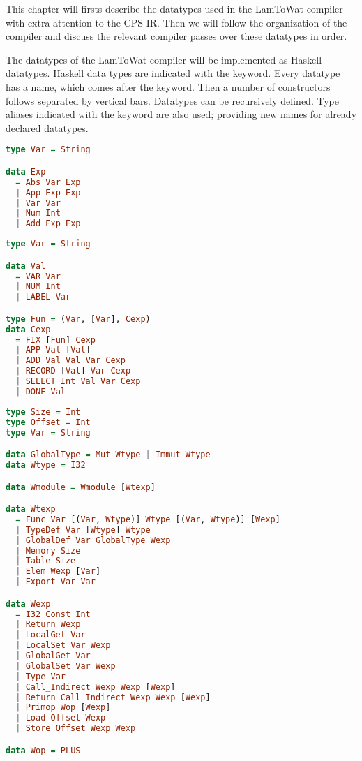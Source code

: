 This chapter will firsts describe the datatypes used in the LamToWat compiler with extra attention to the \ac{CPS} \ac{IR}. Then we will follow the organization of the compiler and discuss the relevant compiler passes over these datatypes in order.

The datatypes of the LamToWat compiler will be implemented as Haskell datatypes. Haskell data types are indicated with the  keyword. Every datatype has a name, which comes after the keyword. Then a number of constructors follows separated by vertical bars. Datatypes can be recursively defined. Type aliases indicated with the  keyword are also used; providing new names for already declared datatypes.


\begin{lstlisting}[language=Haskell]
type Var = String

data Exp
  = Abs Var Exp
  | App Exp Exp
  | Var Var
  | Num Int
  | Add Exp Exp
\end{lstlisting}

\begin{lstlisting}[language=Haskell]
type Var = String

data Val
  = VAR Var
  | NUM Int
  | LABEL Var

type Fun = (Var, [Var], Cexp)
data Cexp
  = FIX [Fun] Cexp
  | APP Val [Val]
  | ADD Val Val Var Cexp
  | RECORD [Val] Var Cexp
  | SELECT Int Val Var Cexp
  | DONE Val
\end{lstlisting}

\begin{lstlisting}[language=Haskell]
type Size = Int
type Offset = Int
type Var = String

data GlobalType = Mut Wtype | Immut Wtype
data Wtype = I32

data Wmodule = Wmodule [Wtexp]

data Wtexp
  = Func Var [(Var, Wtype)] Wtype [(Var, Wtype)] [Wexp]
  | TypeDef Var [Wtype] Wtype
  | GlobalDef Var GlobalType Wexp
  | Memory Size
  | Table Size
  | Elem Wexp [Var]
  | Export Var Var

data Wexp
  = I32_Const Int
  | Return Wexp
  | LocalGet Var
  | LocalSet Var Wexp
  | GlobalGet Var
  | GlobalSet Var Wexp
  | Type Var
  | Call_Indirect Wexp Wexp [Wexp]
  | Return_Call_Indirect Wexp Wexp [Wexp]
  | Primop Wop [Wexp]
  | Load Offset Wexp
  | Store Offset Wexp Wexp

data Wop = PLUS
\end{lstlisting}
